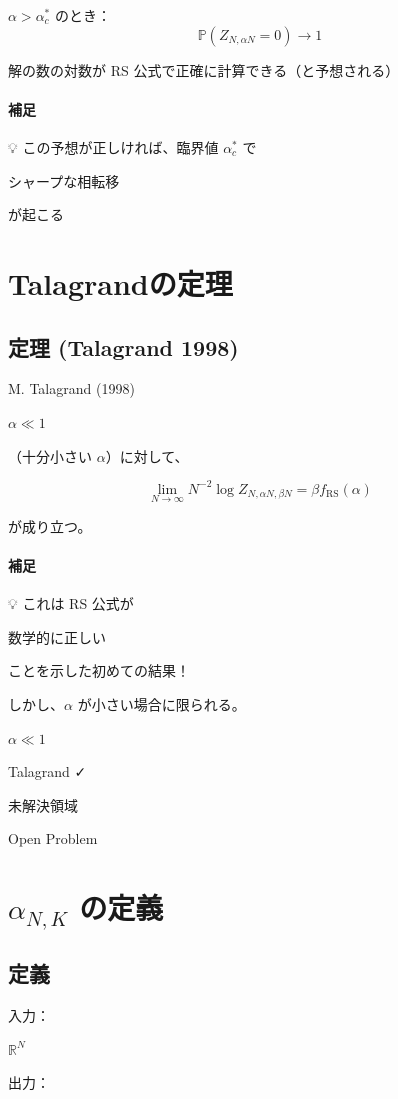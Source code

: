 \documentclass[uplatex,dvipdfmx,11pt,a4paper,openany]{bxjsbook}
\begin{document}
\(\alpha > \alpha_c^*\) のとき：
                \[ \mathbb{P}(Z_{N, \alpha N} = 0) \to 1 \]

解の数の対数が RS 公式で正確に計算できる（と予想される）


\paragraph{補足}
💡 この予想が正しければ、臨界値 \(\alpha_c^*\) で

シャープな相転移

が起こる


\section{Talagrandの定理}
\subsection{定理 (Talagrand 1998)}
M. Talagrand (1998)

\( \alpha \ll 1 \)

（十分小さい \( \alpha \)）に対して、

\[ \lim_{N \to \infty} N^{-2} \log Z_{N, \alpha N,\beta N} = \beta f_{\mathrm{RS}}(\alpha) \]

が成り立つ。

\paragraph{補足}
💡 これは RS 公式が

数学的に正しい

ことを示した初めての結果！

\allowbreak{}

しかし、\( \alpha \) が小さい場合に限られる。


\( \alpha \ll 1 \)

Talagrand ✓

未解決領域

Open Problem

\section{\(\alpha_{N,K}\) の定義}
\subsection{定義}
入力：

\(\mathbb{R}^N\)

出力：
\end{document}
